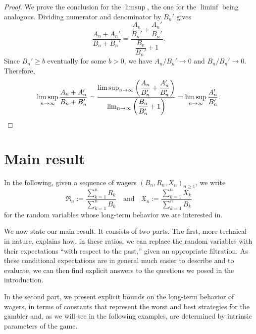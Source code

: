 \documentclass{article}
\theoremstyle{definition}
\theoremstyle{remark}
\begin{document}
\begin{proof}
We prove the conclusion for the $\limsup$, the one for the $\liminf$ being analogous.  
Dividing numerator and denominator by $B_n'$ gives
\[
    \frac{A_n+A_n'}{B_n+B_n'}
    = \frac{\dfrac{A_n}{B_n'}+\dfrac{A_n'}{B_n'}}{\dfrac{B_n}{B_n'}+1}.
\]
Since $B_n' \ge b$ eventually for some $b>0$, we have $A_n/B_n' \to 0$ and $B_n/B_n' \to 0$. Therefore,
\[
    \limsup_{n\to\infty}\frac{A_n+A_n'}{B_n+B_n'}
    =
    \frac{\limsup_{n\to\infty}\bigg(\dfrac{A_n}{B_n'}+\dfrac{A_n'}{B_n'}\bigg)}
         {\lim_{n\to\infty}\bigg(\dfrac{B_n}{B_n'}+1\bigg)}
    = \limsup_{n\to\infty}\frac{A_n'}{B_n'}.
\qedhere
\]
\end{proof}





\section{Main result}\label{sec:main}

In the following, given a sequence of wagers $(B_n,R_n,X_n)_{n\ge1}$, we write
\[
 \mathfrak{R}_n := \frac{\sum_{k=1}^n R_k}{\sum_{k=1}^n B_k}
 \quad\text{and}\quad
 \mathfrak{X}_n := \frac{\sum_{k=1}^n X_k}{\sum_{k=1}^n B_k}
\]
for the random variables whose long-term behavior we are interested in.

We now state our main result. It consists of two parts.  The first, more technical in nature, explains how, in these ratios, we can replace the random variables with their expectations ``with respect to the past,'' given an appropriate filtration.  As these conditional expectations are in general much easier to describe and to evaluate, we can then find explicit answers to the questions we posed in the introduction. 

In the second part, we present explicit bounds on the long-term behavior of wagers, in terms of constants that represent the worst and best strategies for the gambler and, as we will see in the following examples, are determined by intrinsic parameters of the game. 
\end{document}
